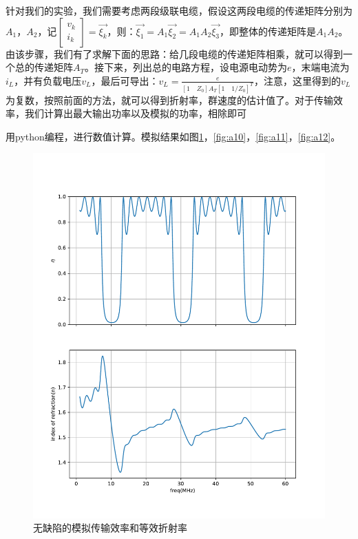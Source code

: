 \documentclass[fleqn,10pt]{SelfArx} %
\begin{document}
针对我们的实验，我们需要考虑两段级联电缆，假设这两段电缆的传递矩阵分别为$A_1$，$A_2$，记$\begin{bmatrix}v_k\\i_k\end{bmatrix}=\vec{\xi_k}$，则：$\vec{\xi_1}=A_1\vec{\xi_2}=A_1A_2\vec{\xi_3}$，即整体的传递矩阵是$A_1A_2$。由该步骤，我们有了求解下面的思路：给几段电缆的传递矩阵相乘，就可以得到一个总的传递矩阵$A_T$。接下来，列出总的电路方程，设电源电动势为$e$，末端电流为$i_L$，并有负载电压$v_L$，最后可导出：$v_L=\frac{e}{[1\quad Z_0]A_T[1\quad 1/Z_0]^T}$，注意，这里得到的$v_L$为复数，按照前面的方法，就可以得到折射率，群速度的估计值了。对于传输效率，我们计算出最大输出功率以及模拟的功率，相除即可

用python编程，进行数值计算。模拟结果如图\ref{fig:a9}，\ref{fig:a10}，\ref{fig:a11}，\ref{fig:a12}。
\begin{figure}[htbp]
	\centering
	\includegraphics[width=\linewidth]{sim-eta-n.pdf}
	\caption{无缺陷的模拟传输效率和等效折射率}
	\label{fig:a9}
\end{figure}
\end{document}
